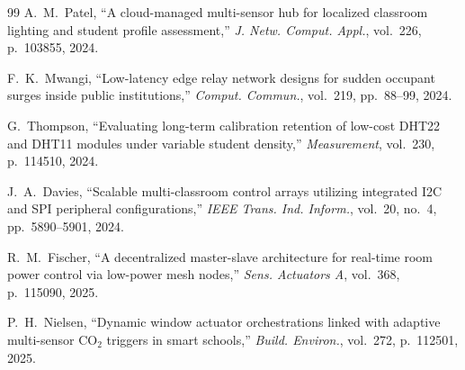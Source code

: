 \begin{thebibliography}{99}
A.~M.~Patel, ``A cloud-managed multi-sensor hub for localized classroom lighting and student profile assessment,'' \textit{J. Netw. Comput. Appl.}, vol.~226, p.~103855, 2024.

F.~K.~Mwangi, ``Low-latency edge relay network designs for sudden occupant surges inside public institutions,'' \textit{Comput. Commun.}, vol.~219, pp.~88--99, 2024.

G.~Thompson, ``Evaluating long-term calibration retention of low-cost DHT22 and DHT11 modules under variable student density,'' \textit{Measurement}, vol.~230, p.~114510, 2024.

J.~A.~Davies, ``Scalable multi-classroom control arrays utilizing integrated I2C and SPI peripheral configurations,'' \textit{IEEE Trans. Ind. Inform.}, vol.~20, no.~4, pp.~5890--5901, 2024.

R.~M.~Fischer, ``A decentralized master-slave architecture for real-time room power control via low-power mesh nodes,'' \textit{Sens. Actuators A}, vol.~368, p.~115090, 2025.

P.~H.~Nielsen, ``Dynamic window actuator orchestrations linked with adaptive multi-sensor CO$_2$ triggers in smart schools,'' \textit{Build. Environ.}, vol.~272, p.~112501, 2025.

\end{thebibliography}
